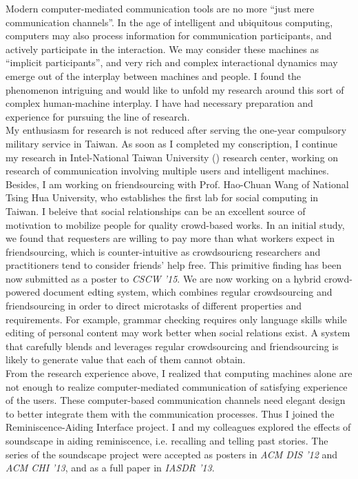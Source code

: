 \noindent
Modern computer-mediated communication tools are no more ``just mere communication channels''. 
In the age of intelligent and ubiquitous computing, computers may also process information for communication participants, 
and actively participate in the interaction. 
We may consider these machines as ``implicit participants'', 
and very rich and complex interactional dynamics may emerge out of the interplay between machines and people. 
I found the phenomenon intriguing and would like to unfold my research around this sort of complex human-machine interplay. 
I have had necessary preparation and experience for pursuing the line of research.\\

\noindent
My enthusiasm for research is not reduced after serving the one-year compulsory military service in Taiwan. 
As soon as I completed my conscription, I continue my research in Intel-National Taiwan University () research center, 
working on research of communication involving multiple users and intelligent machines. 
Besides, I am working on friendsourcing with Prof. Hao-Chuan Wang of National Tsing Hua University, 
who establishes the first lab for social computing in Taiwan. 
I beleive that social relationships can be an excellent source of motivation to mobilize people for quality crowd-based works. 
In an initial study, we found that requesters are willing to pay more than what workers expect in friendsourcing, 
which is counter-intuitive as crowdsouricng researchers and practitioners tend to consider friends' help free. 
This primitive finding has been now submitted as a poster to \emph{CSCW '15}. 
We are now working on a hybrid crowd-powered document edting system, 
which combines regular crowdsourcing and friendsourcing in order to direct microtasks of different properties and requirements. 
For example, grammar checking requires only language skills while editing of personal content may work better when social relations exist. 
A system that carefully blends and leverages regular crowdsourcing and friendsourcing is likely to generate value that each of them cannot obtain.\\

\noindent
From the research experience above, 
I realized that computing machines alone are not enough to realize computer-mediated communication of satisfying experience of the users. 
These computer-based communication channels need elegant design to better integrate them with the communication processes. 
Thus I joined the Reminiscence-Aiding Interface project.
I and my colleagues explored the effects of soundscape in aiding reminiscence, i.e. recalling and telling past stories. 
The series of the soundscape project were accepted as posters in \emph{ACM DIS '12} and \emph{ACM CHI '13}, and as a full paper in \emph{IASDR '13}.\\


